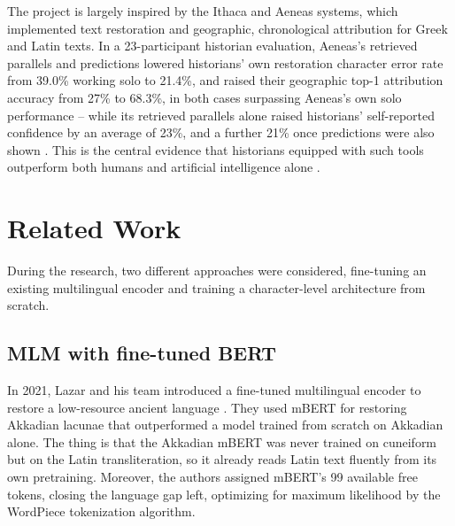\documentclass{article}
\begin{document}
The project is largely inspired by the Ithaca \cite{assael2022} and Aeneas \cite{assael2025} systems, which implemented text restoration and geographic, chronological attribution for Greek and Latin texts. In a 23-participant historian evaluation, Aeneas's retrieved parallels and predictions lowered historians' own restoration character error rate from 39.0\% working solo to 21.4\%, and raised their geographic top-1 attribution accuracy from 27\% to 68.3\%, in both cases surpassing Aeneas's own solo performance -- while its retrieved parallels alone raised historians' self-reported confidence by an average of 23\%, and a further 21\% once predictions were also shown \cite{assael2025}. This is the central evidence that historians equipped with such tools outperform both humans and artificial intelligence alone \cite{assael2022,assael2025}.

\section{Related Work}
During the research, two different approaches were considered, fine-tuning an existing multilingual encoder and training a character-level architecture from scratch.


\subsection{MLM with fine-tuned BERT}
In 2021, Lazar and his team introduced a fine-tuned multilingual encoder to restore a low-resource ancient language \cite{lazar2021}. They used mBERT for restoring Akkadian lacunae that outperformed a model trained from scratch on Akkadian alone. The thing is that the Akkadian mBERT was never trained on cuneiform but on the Latin transliteration, so it already reads Latin text fluently from its own pretraining. Moreover, the authors assigned mBERT's 99 available free tokens, closing the language gap left, optimizing for maximum likelihood by the WordPiece tokenization algorithm.
\end{document}
